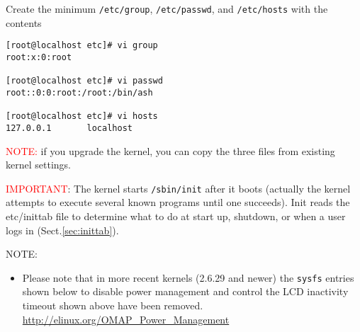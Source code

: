 Create the minimum \verb!/etc/group!, \verb!/etc/passwd!, and \verb!/etc/hosts!
with the contents
\begin{verbatim}
[root@localhost etc]# vi group
root:x:0:root

[root@localhost etc]# vi passwd
root::0:0:root:/root:/bin/ash 

[root@localhost etc]# vi hosts
127.0.0.1       localhost
\end{verbatim}
\textcolor{red}{NOTE:} if you upgrade the kernel, you can copy the three files
from existing kernel settings.

\textcolor{red}{IMPORTANT}: The kernel starts \verb!/sbin/init! after it boots
(actually the kernel attempts to execute several known programs until one
succeeds). Init reads the etc/inittab file to determine what to do at start up,
shutdown, or when a user logs in (Sect.\ref{sec:inittab}). 

NOTE: 
\begin{itemize}
  \item Please note that in more recent kernels (2.6.29 and newer) the
\verb!sysfs! entries shown below to disable power management and control the LCD
inactivity timeout shown above have been removed.
\url{http://elinux.org/OMAP_Power_Management}
  
\end{itemize}



